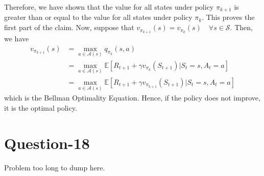 \documentclass[11pt]{article}
\begin{document}
    Therefore, we have shown that the value for all states under policy $\pi_{k+1}$ is greater than or equal
    to the value for all states under policy $\pi_{k}$. This proves the first part of the claim. Now, suppose that
    $v_{\pi_{k+1}}(s) = v_{\pi_{k}}(s) \quad \forall s \in \mathcal{S}$. Then, we have
    \begin{align*}
        v_{\pi_{k+1}}(s) &= \max_{a \in \mathcal{A}(s)} q_{\pi_{k}}(s, a) \\
        &= \max_{a \in \mathcal{A}(s)} \mathbb{E}[R_{t+1} + \gamma v_{\pi_{k}}(S_{t+1}) | S_{t} = s, A_{t} = a] \\
        &= \max_{a \in \mathcal{A}(s)} \mathbb{E}[R_{t+1} + \gamma v_{\pi_{k+1}}(S_{t+1}) | S_{t} = s, A_{t} = a]
    \end{align*}
    which is the Bellman Optimality Equation. Hence, if the policy does not improve, it is the optimal policy.

    \section*{Question-18}
    Problem too long to dump here.
\end{document}
